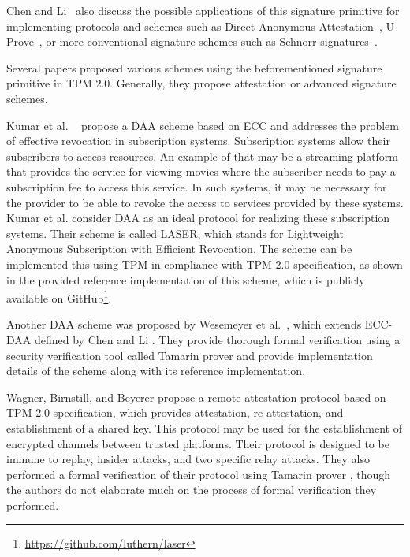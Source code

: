 Chen and Li~\cite{chen2013flexible} also discuss the possible applications of this signature primitive for implementing protocols and schemes such as Direct Anonymous Attestation~\cite{daaSpec}, U-Prove~\cite{uproveSpec}, or more conventional signature schemes such as Schnorr signatures~\cite{schnorrSpec}. 

Several papers proposed various schemes using the beforementioned signature primitive in TPM 2.0. Generally, they propose attestation or advanced signature schemes.

Kumar et al. ~\cite{kumar2018direct} propose a DAA scheme based on ECC and addresses the problem of effective revocation in subscription systems. Subscription systems allow their subscribers to access resources. An example of that may be a streaming platform that provides the service for viewing movies where the subscriber needs to pay a subscription fee to access this service. In such systems, it may be necessary for the provider to be able to revoke the access to services provided by these systems. Kumar et al. consider DAA as an ideal protocol for realizing these subscription systems. Their scheme is called LASER, which stands for Lightweight Anonymous Subscription with Efficient Revocation. The scheme can be implemented this using TPM in compliance with TPM 2.0 specification, as shown in the provided reference implementation of this scheme, which is publicly available on GitHub\footnote{\url{https://github.com/luthern/laser}}. 

Another DAA scheme was proposed by Wesemeyer et al.~\cite{wesemeyerDAA}, which extends ECC-DAA defined by Chen and Li \cite{chen2013flexible}. They provide thorough formal verification using a security verification tool called Tamarin prover \cite{meier2013tamarin} and provide implementation details of the scheme along with its reference implementation.

Wagner, Birnstill, and Beyerer \cite{wagnerRemoteAttProtocol} propose a remote attestation protocol based on TPM 2.0 specification, which provides attestation, re-attestation, and establishment of a shared key. This protocol may be used for the establishment of encrypted channels between trusted platforms. Their protocol is designed to be immune to replay, insider attacks, and two specific relay attacks. They also performed a formal verification of their
protocol using Tamarin prover \cite{meier2013tamarin}, though the authors do not elaborate much on the process of formal verification they performed.

